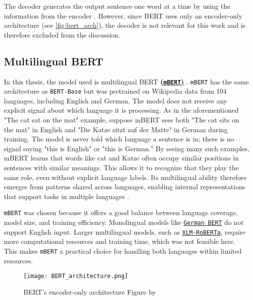 The decoder generates the output sentence one word at a time by using the information from the encoder \parencite{xiaoIntroductionTransformersNLP2023}. However, since BERT uses only an encoder-only architecture (see \autoref{fig:bert_arch}), the decoder is not relevant for this work and is therefore excluded from the discussion.

\subsection{Multilingual BERT}
    In this thesis, the model used is multilingual BERT \textbf{\href{https://huggingface.co/google-bert/bert-base-multilingual-cased}{(\texttt{mBERT})}} \parencite{devlinBERTPretrainingDeep2019}. \texttt{mBERT} has the same architecture as \texttt{BERT-Base} but was pretrained on Wikipedia data from 104 languages, including English and German. The model does not receive any explicit signal about which language it is processing. As in the aforementioned "The cat sat on the mat" example, suppose mBERT sees both "The cat sits on the mat" in English and "Die Katze sitzt auf der Matte" in German during training. The model is never told which language a sentence is in; there is no signal saying "this is English" or "this is German." By seeing many such examples, mBERT learns that words like cat and Katze often occupy similar positions in sentences with similar meanings. This allows it to recognize that they play the same role, even without explicit language labels. Its multilingual ability therefore emerges from patterns shared across languages, enabling internal representations that support tasks in multiple languages \parencite{piresHowMultilingualMultilingual2019}. 
    
    \texttt{mBERT} was chosen because it offers a good balance between language coverage, model size, and training efficiency. Monolingual models like \href{https://huggingface.co/google-bert/bert-base-german-cased}{\texttt{German BERT}} do not support English input. Larger multilingual models, such as \href{https://huggingface.co/docs/transformers/en/model_doc/xlm-roberta}{\texttt{XLM-RoBERTa}}, require more computational resources and training time, which was not feasible here. This makes \texttt{mBERT} a practical choice for handling both languages within limited resources.

\begin{figure}
    \centering
	\texttt{[image: BERT\_architecture.png]}	
    \caption[BERT's encoder-only architecture]{BERT's encoder-only architecture Figure by \textcite{smithCompleteGuideBERT2024}}
    \label{fig:bert_arch}
\end{figure}

